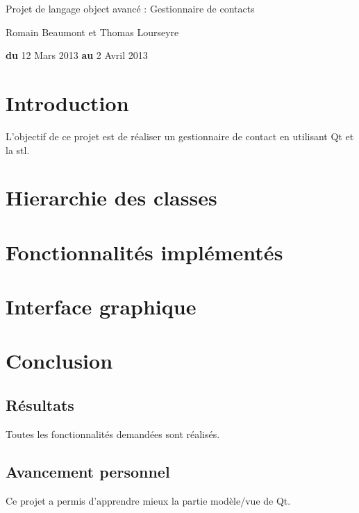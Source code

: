 \documentclass{report}
\begin{document}
\begin{titlepage}
\begin{center}
\end{center}

\flushright
\begin{center}
\bigskip
\bigskip
\bigskip
\bigskip
\bigskip
\bigskip
\bigskip
\bigskip
\bigskip
\bigskip
\bigskip
\bigskip
\huge{Projet de langage object avancé : Gestionnaire de contacts}\\
\end{center}
\begin{center}
\bigskip
\bigskip
\bigskip
\bigskip
\bigskip
\bigskip
\bigskip
\bigskip
\bigskip
Romain Beaumont et Thomas Lourseyre\\
\bigskip
\bigskip
\bigskip
\bigskip
\bigskip
\bigskip
\bigskip
\bigskip
\bigskip
\bigskip
\bigskip
\bigskip
\bigskip
\bigskip
\bigskip

\textbf{du} 12 Mars 2013  \textbf{au} 2 Avril 2013

\bigskip
\bigskip
\bigskip
\end{center}
\end{titlepage}
 
\tableofcontents


\chapter{Introduction}
\par
L'objectif de ce projet est de réaliser un gestionnaire de contact en utilisant Qt et la stl.

\chapter{Hierarchie des classes}
\par

\chapter{Fonctionnalités implémentés}
\par

\chapter{Interface graphique}
\par


\chapter{Conclusion}
\section{Résultats}
\par
Toutes les fonctionnalités demandées sont réalisés.
\section{Avancement personnel}
\par
Ce projet a permis d'apprendre mieux la partie modèle/vue de Qt.
\end{document}
